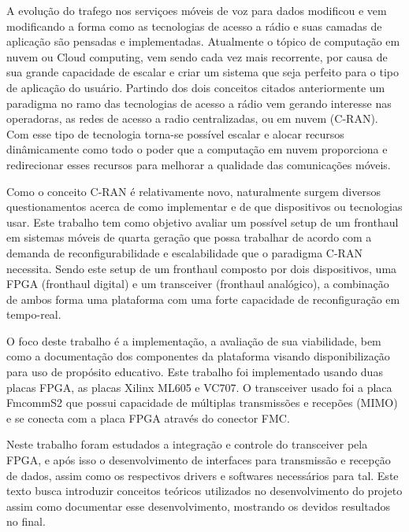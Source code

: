 \documentclass{ufpatcc}
\begin{document}
\tableofcontents    \clearpage


\begin{ufpaResumo}

A evolu\c{c}\~{a}o do trafego nos servi\c{c}oes m\'{o}veis de voz para dados
modificou e vem modificando a forma como as tecnologias de acesso a r\'{a}dio e
suas camadas de aplica\c{c}\~{a}o s\~{a}o pensadas e implementadas. Atualmente o
t\'{o}pico de computa\c{c}\~{a}o em nuvem ou Cloud computing, vem sendo cada vez
mais recorrente, por causa de sua grande capacidade de escalar e criar um
sistema que seja perfeito para o tipo de aplica\c{c}\~{a}o do usu\'{a}rio.
Partindo dos dois conceitos citados anteriormente um paradigma no ramo das
tecnologias de acesso a r\'{a}dio vem gerando interesse nas operadoras, as redes
de acesso a radio centralizadas, ou em nuvem (C-RAN). Com esse tipo de
tecnologia torna-se poss\'{i}vel escalar e alocar recursos dinâmicamente como
todo o poder que a computa\c{c}\~{a}o em nuvem proporciona e redirecionar esses
recursos para melhorar a qualidade das comunica\c{c}\~{o}es m\'{o}veis.

Como o conceito C-RAN \'{e} relativamente novo, naturalmente surgem diversos
questionamentos acerca de como implementar e de que dispositivos ou tecnologias
usar. Este trabalho tem como objetivo avaliar um poss\'{i}vel setup de um
fronthaul em sistemas m\'{o}veis de quarta gera\c{c}\~{a}o que possa trabalhar
de acordo com a demanda de reconfigurabilidade e escalabilidade que o paradigma
C-RAN necessita. Sendo este setup de um fronthaul composto por dois
dispositivos, uma FPGA (fronthaul digital) e um transceiver (fronthaul
anal\'{o}gico), a combina\c{c}\~{a}o de ambos forma uma plataforma com uma forte
capacidade de reconfigura\c{c}\~{a}o em tempo-real.

O foco deste trabalho \'{e} a implementa\c{c}\~{a}o, a avalia\c{c}\~{a}o de sua
viabilidade, bem como a documenta\c{c}\~{a}o dos componentes da plataforma
visando disponibiliza\c{c}\~{a}o para uso de prop\'{o}sito educativo. Este
trabalho foi implementado usando duas placas FPGA, as placas Xilinx ML605 e
VC707. O transceiver usado foi a placa FmcommS2 que possui capacidade de
múltiplas transmiss\~{o}es e recep\~{o}es (MIMO) e se conecta com a placa FPGA
atrav\'{e}s do conector FMC.

Neste trabalho foram estudados a integra\c{c}\~{a}o e controle do transceiver
pela FPGA, e ap\'{o}s isso o desenvolvimento de interfaces para transmiss\~{a}o
e recep\c{c}\~{a}o de dados, assim como os respectivos drivers e softwares
necess\'{a}rios para tal. Este texto busca introduzir conceitos te\'{o}ricos
utilizados no desenvolvimento do projeto assim como documentar esse
desenvolvimento, mostrando os devidos resultados no final.

\end{ufpaResumo}
\end{document}
